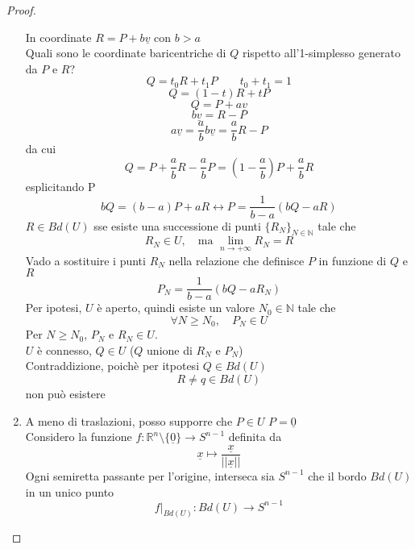 \documentclass[a4paper]{report}
\newcommand{\N}{\ensuremath{\mathbb{N}}}
\newcommand{\R}{\ensuremath{\mathbb{R}}}
\newcommand{\ra}{\ensuremath{\rightarrow}}
\begin{document}
\begin{proof}
\begin{enumerate}
\begin{center}
\begin{tikzpicture}[x=0.75pt,y=0.75pt,yscale=-1,xscale=1]
                  \end{tikzpicture}

              \end{center}
              In coordinate $R=P+b\underline{v}$ con $b>a$\\
              Quali sono le coordinate baricentriche di $Q$ rispetto all'1-simplesso generato da $P$ e $R$?
              \[
                  Q=t_0R+t_1P\quad\quad t_0+t_1=1
              \]
              \[
                  Q=(1-t)R+tP
              \]
              \[
                  Q=P+a\underline{v}
              \]
              \[
                  b\underline{v}=R-P
              \]
              \[
                  a\underline{v}=\frac{a}{b}b\underline{v}=\frac{a}{b}R-P
              \]
              da cui
              \[
                  Q=P+\frac{a}{b}R-\frac{a}{b}P=\left(1-\frac{a}{b}\right)P+\frac{a}{b}R
              \]
              esplicitando P
              \[
                  bQ=(b-a)P+aR\longleftrightarrow P=\frac{1}{b-a}(bQ-aR)
              \]
              $R\in Bd(U)$ sse esiste una successione di punti $\{R_N\}_{N\in\N}$ tale che
              \[
                  R_N\in U,\quad \text{ma } \lim_{n\ra+\infty}R_N=R
              \]
              Vado a sostituire i punti $R_N$ nella relazione che definisce $P$ in funzione di $Q$ e $R$
              \[
                  P_N=\frac{1}{b-a}(bQ-aR_N)
              \]
              Per ipotesi, $U$ è aperto, quindi esiste un valore $N_0\in\N$ tale che
              \[
                  \forall N\geq N_0,\quad P_N\in U
              \]
              Per $N\geq N_0$, $P_N$ e $R_N\in U$.\\
              $U$ è connesso, $Q\in U$ ($Q$ unione di $R_N$ e $P_N$)\\
              Contraddizione, poichè per itpotesi $Q\in Bd(U)$\\
              \[
                  R\neq q\in Bd(U)
              \]
              non può esistere
        \item A meno di traslazioni, posso supporre che $P\in U$ $P=\underline{0}$\\
              Considero la funzione $f:\R^n\setminus\{\underline{0}\}\ra S^{n-1}$ definita da
              \[
                  \underline{x}\mapsto\frac{\underline{x}}{||\underline{x}||}
              \]
              Ogni semiretta passante per l'origine, interseca sia $S^{n-1}$ che il bordo $Bd(U)$ in un unico punto
              \[
                  \left.f\right|_{Bd(U)}:Bd(U)\ra S^{n-1}
\]
\end{enumerate}
\end{proof}
\end{document}

